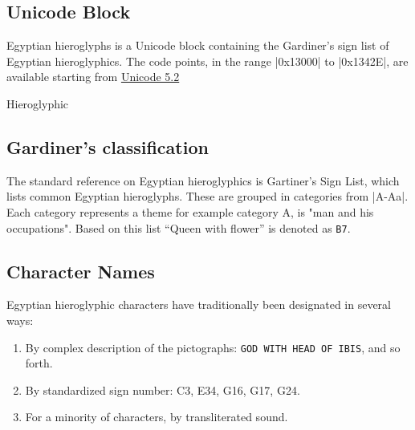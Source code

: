 \ifluatex
\bgroup
\centering 
\aegyptus
\scalebox{7}{\char"F300C}
\scalebox{7}{\char"F3001}
\scalebox{7}{\char"F3010}
\scalebox{7}{\char"F308B}
\scalebox{7}{\char"F3097}
\scalebox{7}{\char"F3091}
\egroup

\fi


\subsection{Unicode Block}

Egyptian hieroglyphs is a Unicode block containing the Gardiner's sign list of Egyptian hieroglyphics.
The code points, in the range |0x13000| to |0x1342E|, are available starting from
\href{http://unicode.org/charts/PDF/U13000.pdf}{Unicode 5.2}

\begin{scriptexample}[]{Hieroglyphic}
\bgroup
{}
\egroup
\end{scriptexample}

\subsection{Gardiner's classification}

The standard reference on Egyptian hieroglyphics is Gartiner's Sign List, which lists common Egyptian hieroglyphs. These are grouped in categories from |A-Aa|. Each category represents a theme for example category A, is "man and his occupations". Based on this list ``Queen with flower'' is denoted as \texttt{B7}. 

\subsection{Character Names} 

Egyptian hieroglyphic characters have traditionally been designated in
several ways:

\begin{enumerate}
\item  By complex description of the pictographs: \texttt{GOD WITH HEAD OF IBIS}, and so forth.
\item By standardized sign number: C3, E34, G16, G17, G24.
\item For a minority of characters, by transliterated sound.
\end{enumerate}

